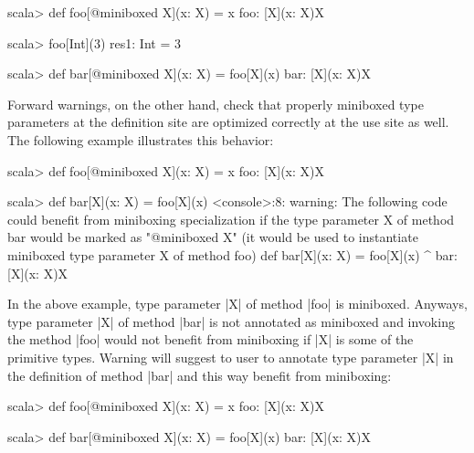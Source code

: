\begin{lstlisting-nobreak}
scala> def foo[@miniboxed X](x: X) = x
foo: [X](x: X)X

scala> foo[Int](3)
res1: Int = 3

scala> def bar[@miniboxed X](x: X) = foo[X](x)
bar: [X](x: X)X
\end{lstlisting-nobreak}
Forward warnings, on the other hand, check that properly miniboxed type parameters at the definition site are optimized correctly at the use site as well. The following example illustrates this behavior:

\begin{lstlisting-nobreak}
scala> def foo[@miniboxed X](x: X) = x
foo: [X](x: X)X

scala> def bar[X](x: X) = foo[X](x)
<console>:8: warning: The following code could benefit from miniboxing specialization if the type parameter X of method bar would be marked as "@miniboxed X" (it would be used to instantiate miniboxed type parameter X of method foo)
       def bar[X](x: X) = foo[X](x)
                             ^
bar: [X](x: X)X
\end{lstlisting-nobreak}
In the above example, type parameter |X| of method |foo| is miniboxed.  Anyways, type parameter |X| of method |bar| is not annotated as miniboxed  and invoking the method |foo| would not benefit from miniboxing if |X| is  some of the primitive types.  Warning will suggest to user to annotate type parameter |X| in the definition of method |bar| and this way benefit from miniboxing:

\begin{lstlisting-nobreak}
scala> def foo[@miniboxed X](x: X) = x
foo: [X](x: X)X

scala> def bar[@miniboxed X](x: X) = foo[X](x)
bar: [X](x: X)X
\end{lstlisting-nobreak}
\paragraph{}

